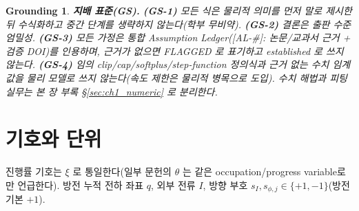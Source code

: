 \documentclass[11pt,a4paper]{article}
\newtheorem*{groundingbox}{Grounding}
\newcommand{\AL}[1]{\textsf{[AL-#1]}}
\begin{document}
\begin{groundingbox}
\textbf{지배 표준(GS).} \textbf{(GS-1)} 모든 식은 물리적 의미를 먼저 말로 제시한 뒤 수식화하고 중간
단계를 생략하지 않는다(학부 무비약). \textbf{(GS-2)} 결론은 출판 수준 엄밀성. \textbf{(GS-3)} 모든 가정은
통합 Assumption Ledger(\AL{\#}: 논문/교과서 근거 + 검증 DOI)를 인용하며, 근거가 없으면 FLAGGED 로
표기하고 established 로 쓰지 않는다. \textbf{(GS-4)} 임의 clip/cap/softplus/step-function 정의식과 근거
없는 수치 임계값을 물리 모델로 쓰지 않는다(속도 제한은 물리적 병목으로 도입). 수치 해법과 피팅 실무는
본 장 부록 \S\ref{sec:ch1_numeric} 로 분리한다.
\end{groundingbox}

\tableofcontents
\newpage

\section{기호와 단위}\label{sec:notation}
진행률 기호는 $\xi$ 로 통일한다(일부 문헌의 $\theta$ 는 같은 occupation/progress variable로만 언급한다). 방전 누적 전하 좌표 $q$, 외부 전류 $I$,
방향 부호 $s_I,s_{\phi,j}\in\{+1,-1\}$(방전 기본 $+1$).
\end{document}
